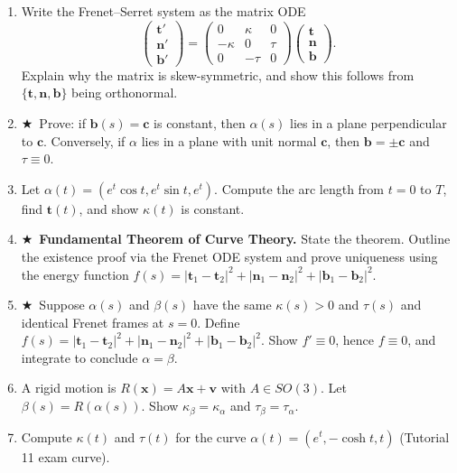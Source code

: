 \documentclass[11pt, a4paper]{article}
\newcommand{\mbf}[1]{\mathbf{#1}}
\newcommand{\kp}{\kappa}
\newcommand{\tp}{\tau}
\newcommand{\hard}{$\bigstar$\ }
\begin{document}
\begin{enumerate}[label=\textbf{Q\arabic*.}, leftmargin=*, itemsep=6pt]
\item Write the Frenet--Serret system as the matrix ODE
\[
  \begin{pmatrix}\mbf{t}'\\\mbf{n}'\\\mbf{b}'\end{pmatrix}=\begin{pmatrix}0&\kp&0\\-\kp&0&\tp\\0&-\tp&0\end{pmatrix}\begin{pmatrix}\mbf{t}\\\mbf{n}\\\mbf{b}\end{pmatrix}.
\]
Explain why the matrix is skew-symmetric, and show this follows from $\{\mbf{t},\mbf{n},\mbf{b}\}$ being orthonormal.

\item \hard Prove: if $\mathbf{b}(s)=\mathbf{c}$ is constant, then $\alpha(s)$ lies in a plane perpendicular to $\mathbf{c}$. Conversely, if $\alpha$ lies in a plane with unit normal $\mathbf{c}$, then $\mathbf{b}=\pm\mathbf{c}$ and $\tp\equiv 0$.

\item Let $\alpha(t)=(e^t\cos t, e^t\sin t, e^t)$. Compute the arc length from $t=0$ to $T$, find $\mbf{t}(t)$, and show $\kp(t)$ is constant.

\item \hard \textbf{Fundamental Theorem of Curve Theory.} State the theorem. Outline the existence proof via the Frenet ODE system and prove uniqueness using the energy function $f(s)=|\mbf{t}_1-\mbf{t}_2|^2+|\mbf{n}_1-\mbf{n}_2|^2+|\mbf{b}_1-\mbf{b}_2|^2$.

\item \hard Suppose $\alpha(s)$ and $\beta(s)$ have the same $\kp(s)>0$ and $\tp(s)$ and identical Frenet frames at $s=0$. Define $f(s)=|\mbf{t}_1-\mbf{t}_2|^2+|\mbf{n}_1-\mbf{n}_2|^2+|\mbf{b}_1-\mbf{b}_2|^2$. Show $f'\equiv 0$, hence $f\equiv 0$, and integrate to conclude $\alpha=\beta$.

\item A rigid motion is $R(\mathbf{x})=A\mathbf{x}+\mathbf{v}$ with $A\in SO(3)$. Let $\beta(s)=R(\alpha(s))$. Show $\kp_\beta=\kp_\alpha$ and $\tp_\beta=\tp_\alpha$.

\item Compute $\kp(t)$ and $\tp(t)$ for the curve $\alpha(t)=(e^t,-\cosh t, t)$ (Tutorial 11 exam curve).


\end{enumerate}
\end{document}
